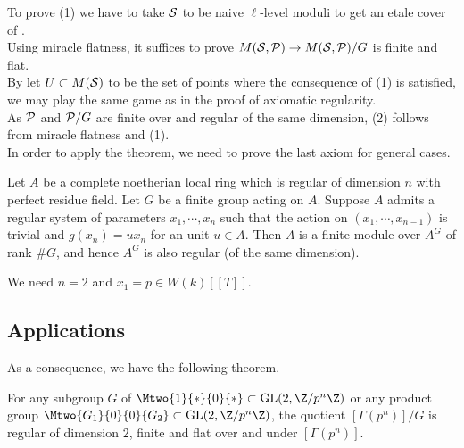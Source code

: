 To prove (1) we have to take $\mathcal{S}$ to be naive $\ell$-level moduli to get an etale cover of \ellr.\\
Using miracle flatness, it suffices to prove $M(\mathcal{S},\mathcal{P})\to M(\mathcal{S},\mathcal{P})/G$ is finite and flat. \\
By let $U\subset M(\mathcal{S})$ to be the set of points where the consequence of (1) is satisfied, we may play the same game as in the proof of axiomatic regularity. \\
As $\mathcal{P}$ and $\mathcal{P}/G$ are finite over \ellr and regular of the same dimension, (2) follows from miracle flatness and (1). \\
In order to apply the theorem, we need to prove the last axiom for general cases. \\
\begin{proposition}
	Let $A$ be a complete noetherian local ring which is regular of dimension $n$ with perfect residue field. Let $G$ be a finite group acting on $A$. Suppose $A$ admits a regular system of parameters $x_1,\cdots,x_n$ such that the action on $(x_1,\cdots, x_{n-1})$ is trivial and $g(x_n) = ux_n$ for an unit $u\in A$. Then $A$ is a finite module over $A^G$ of rank $\#G$, and hence $A^G$ is also regular (of the same dimension).
\end{proposition}
We need $n=2$ and $x_1=p\in W(k)[[T]]$.
\subsection{Applications}
As a consequence, we have the following theorem.
\begin{theorem}
	For any subgroup $G$ of $\Mtwo{1}{*}{0}{*}\subset \text{GL}(2,\Z/p^n\Z)$ or any product group $\Mtwo{G_1}{0}{0}{G_2}\subset \text{GL}(2,\Z/p^n\Z)$, the quotient $[\Gamma(p^n)]/G$ is regular of dimension $2$, finite and flat over \ellr and under $[\Gamma(p^n)]$.
\end{theorem}

